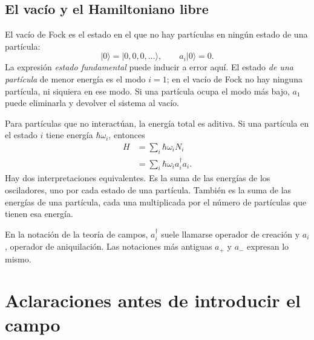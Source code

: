 \subsection{El vacío y el Hamiltoniano libre}

El vacío de Fock es el estado en el que no hay partículas en ningún estado de una partícula:
\begin{equation}
|0\rangle=|0,0,0,\ldots\rangle,
\qquad a_i|0\rangle=0.
\end{equation}
La expresión \emph{estado fundamental} puede inducir a error aquí. El estado \emph{de una partícula} de menor energía es el modo \(i=1\); en el vacío de Fock no hay ninguna partícula, ni siquiera en ese modo. Si una partícula ocupa el modo más bajo, \(a_1\) puede eliminarla y devolver el sistema al vacío.

\begin{classroomqa}
\end{classroomqa}

Para partículas que no interactúan, la energía total es aditiva. Si una partícula en el estado \(i\) tiene energía \(\hbar\omega_i\), entonces
\begin{align}
H
&=\sum_i \hbar\omega_i N_i \\
&=\sum_i \hbar\omega_i a_i^\dagger a_i.
\label{eq:l06-free-fock-hamiltonian}
\end{align}
Hay dos interpretaciones equivalentes. Es la suma de las energías de los osciladores, uno por cada estado de una partícula. También es la suma de las energías de una partícula, cada una multiplicada por el número de partículas que tienen esa energía.

En la notación de la teoría de campos, \(a_i^\dagger\) suele llamarse operador de creación y \(a_i\), operador de aniquilación. Las notaciones más antiguas \(a_+\) y \(a_-\) expresan lo mismo.

\section{Aclaraciones antes de introducir el campo}

